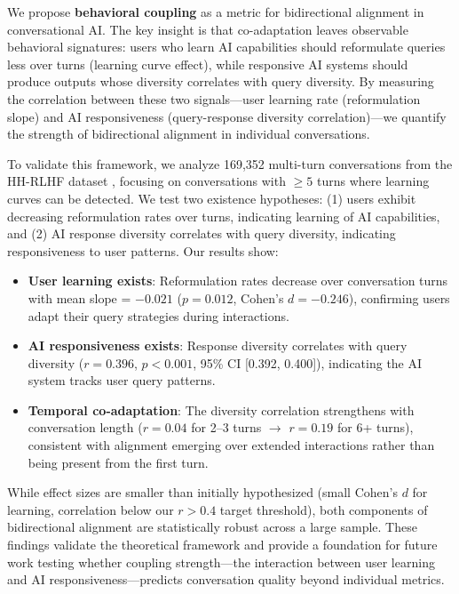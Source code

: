 We propose \textbf{behavioral coupling} as a metric for bidirectional alignment in conversational AI. The key insight is that co-adaptation leaves observable behavioral signatures: users who learn AI capabilities should reformulate queries less over turns (learning curve effect), while responsive AI systems should produce outputs whose diversity correlates with query diversity. By measuring the correlation between these two signals---user learning rate (reformulation slope) and AI responsiveness (query-response diversity correlation)---we quantify the strength of bidirectional alignment in individual conversations.

To validate this framework, we analyze 169,352 multi-turn conversations from the HH-RLHF dataset \cite{bai2022constitutional}, focusing on conversations with $\geq 5$ turns where learning curves can be detected. We test two existence hypotheses: (1) users exhibit decreasing reformulation rates over turns, indicating learning of AI capabilities, and (2) AI response diversity correlates with query diversity, indicating responsiveness to user patterns. Our results show:

\begin{itemize}
\item \textbf{User learning exists}: Reformulation rates decrease over conversation turns with mean slope = $-0.021$ ($p=0.012$, Cohen's $d=-0.246$), confirming users adapt their query strategies during interactions.
\item \textbf{AI responsiveness exists}: Response diversity correlates with query diversity ($r=0.396$, $p<0.001$, 95\% CI [0.392, 0.400]), indicating the AI system tracks user query patterns.
\item \textbf{Temporal co-adaptation}: The diversity correlation strengthens with conversation length ($r=0.04$ for 2--3 turns $\rightarrow$ $r=0.19$ for 6+ turns), consistent with alignment emerging over extended interactions rather than being present from the first turn.
\end{itemize}

While effect sizes are smaller than initially hypothesized (small Cohen's $d$ for learning, correlation below our $r>0.4$ target threshold), both components of bidirectional alignment are statistically robust across a large sample. These findings validate the theoretical framework and provide a foundation for future work testing whether coupling strength---the interaction between user learning and AI responsiveness---predicts conversation quality beyond individual metrics.

